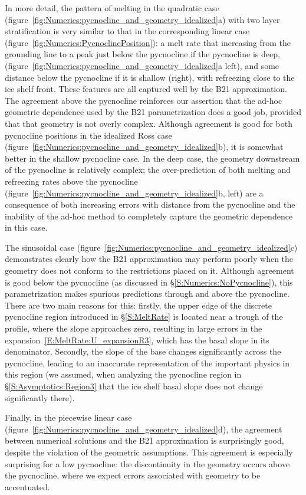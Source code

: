 \documentclass[openacc]{rsproca_new}%
\begin{document}
In more detail, the pattern of melting in the quadratic case (figure~\ref{fig:Numerics:pycnocline_and_geometry_idealized}a) with two layer stratification is very similar to that in the corresponding linear case (figure~\ref{fig:Numerics:PycnoclinePosition}): a melt rate that increasing from the grounding line to a peak just below the pycnocline if the pycnocline is deep, (figure~\ref{fig:Numerics:pycnocline_and_geometry_idealized}a left), and some distance below the pycnocline if it is shallow (right), with refreezing close to the ice shelf front. These features are all captured well by the B21 approximation. The agreement above the pycnocline reinforces our assertion that the ad-hoc geometric dependence used by the B21 parametrization does a good job, provided that that geometry is not overly complex.
Although agreement is good for both pycnocline positions in the idealized Ross case (figure~\ref{fig:Numerics:pycnocline_and_geometry_idealized}b), it is somewhat better in the shallow pycnocline case. In the deep case, the geometry downstream of the pycnocline is relatively complex; the over-prediction of both melting and refreezing rates above the pycnocline (figure~\ref{fig:Numerics:pycnocline_and_geometry_idealized}b, left) are a consequence of both increasing errors with distance from the pycnocline and the inability of the ad-hoc method to completely capture the geometric dependence in this case. 

The sinusoidal case (figure~\ref{fig:Numerics:pycnocline_and_geometry_idealized}c) demonstrates clearly how the B21 approximation may perform poorly when the geometry does not conform to the restrictions placed on it. Although agreement is good below the pycnocline (as discussed in \S\ref{S:Numerics:NoPycnocline}), this parametrization makes spurious predictions through and above the pycnocline. There are two main reasons for this: firstly, the upper edge of the discrete pycnocline region introduced in \S\ref{S:MeltRate} is located near a trough of the profile, where the slope approaches zero, resulting in large errors in the expansion~\eqref{E:MeltRate:U_expansionR3}, which has the basal slope in its denominator.  Secondly, the slope of the base changes significantly across the pycnocline, leading to an inaccurate representation of the important physics in this region (we assumed, when analyzing the pycnocline region in \S\ref{S:Asymptotics:Region3} that the ice shelf basal slope does not change significantly there).

Finally, in the piecewise linear case (figure~\ref{fig:Numerics:pycnocline_and_geometry_idealized}d), the agreement between numerical solutions and the B21 approximation is surprisingly good, despite the violation of the geometric assumptions. This agreement is especially surprising for a low pycnocline: the discontinuity in the geometry occurs above the pycnocline, where we expect errors associated with geometry to be accentuated. 
\end{document}
